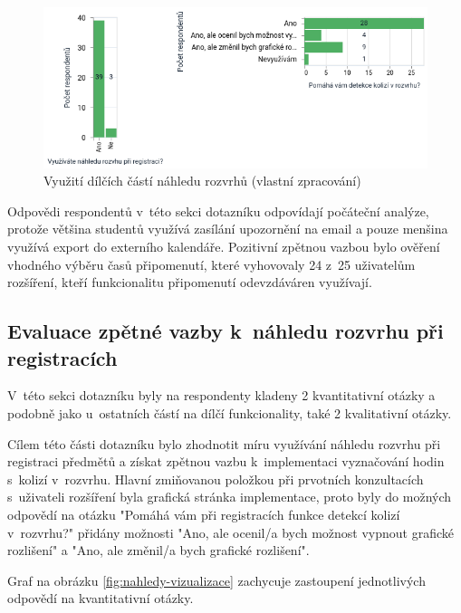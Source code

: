 \begin{figure}[htbp!]\centering
    \includegraphics[width=\textwidth]{img/previews-visualization.png}
    \caption{Využití dílčích částí náhledu rozvrhů (vlastní zpracování)}
    \label{fig:pripomenuti-vizualizace}
\end{figure}

Odpovědi respondentů v~této sekci dotazníku odpovídají počáteční analýze, protože většina studentů využívá zasílání upozornění na email a pouze menšina využívá export do externího kalendáře. Pozitivní zpětnou vazbou bylo ověření vhodného výběru časů připomenutí, které vyhovovaly 24 z~25 uživatelům rozšíření, kteří funkcionalitu připomenutí odevzdáváren využívají.

\subsection{Evaluace zpětné vazby k~náhledu rozvrhu při registracích}

V~této sekci dotazníku byly na respondenty kladeny 2 kvantitativní otázky a podobně jako u~ostatních částí na dílčí funkcionality, také 2 kvalitativní otázky.

Cílem této části dotazníku bylo zhodnotit míru využívání náhledu rozvrhu při registraci předmětů a získat zpětnou vazbu k~implementaci vyznačování hodin s~kolizí v~rozvrhu. Hlavní zmiňovanou položkou při prvotních konzultacích s~uživateli rozšíření byla grafická stránka implementace, proto byly do možných odpovědí na otázku "Pomáhá vám při registracích funkce detekcí kolizí v~rozvrhu?" přidány možnosti "Ano, ale ocenil/a bych možnost vypnout grafické rozlišení" a "Ano, ale změnil/a bych grafické rozlišení".    

Graf na obrázku \ref{fig:nahledy-vizualizace} zachycuje zastoupení jednotlivých odpovědí na kvantitativní otázky.


